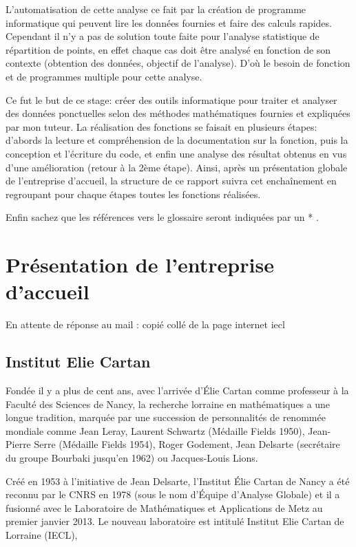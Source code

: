 \documentclass[stage2a]{tnreport}
\begin{document}
L'automatisation de cette analyse ce fait par la création de programme informatique qui peuvent lire les données fournies et faire des calculs rapides.
Cependant il n'y a pas de solution toute faite pour l'analyse statistique de répartition de points, en effet chaque cas doit être analysé en fonction de son contexte (obtention des données, objectif de l'analyse). D'où le besoin de fonction et de programmes multiple pour cette analyse.

Ce fut le but de ce stage: créer des outils informatique pour traiter et analyser des données ponctuelles selon des méthodes mathématiques fournies et expliquées par mon tuteur.
La réalisation des fonctions se faisait en plusieurs étapes: d'abords la lecture et compréhension de la documentation sur la fonction, puis la conception et l'écriture du code, et enfin une analyse des résultat obtenus en vus d'une amélioration (retour à la 2ème étape). Ainsi, après un présentation globale de l'entreprise d'accueil, la structure de ce rapport suivra cet enchaînement en regroupant pour chaque étapes toutes les fonctions réalisées. 

Enfin sachez que les références vers le glossaire seront indiquées par un * .

\newpage

\chapter{Présentation de l'entreprise d'accueil}

En attente de réponse au mail : copié collé de la page internet iecl

\section{Institut Elie Cartan}
Fondée il y a plus de cent ans, avec l’arrivée d’Élie Cartan comme professeur à la Faculté des Sciences de Nancy, la recherche lorraine en mathématiques a une longue tradition, marquée par une succession de personnalités de renommée mondiale comme Jean Leray, Laurent Schwartz (Médaille Fields 1950), Jean-Pierre Serre (Médaille Fields 1954), Roger Godement, Jean Delsarte (secrétaire du groupe Bourbaki jusqu’en 1962) ou Jacques-Louis Lions.

Créé en 1953 à l’initiative de Jean Delsarte, l’Institut Élie Cartan de Nancy a été reconnu par le CNRS en 1978 (sous le nom d’Équipe d’Analyse Globale) et il a fusionné avec le Laboratoire de Mathématiques et Applications de Metz au premier janvier 2013. Le nouveau laboratoire est intitulé Institut Elie Cartan de Lorraine (IECL),
\end{document}
